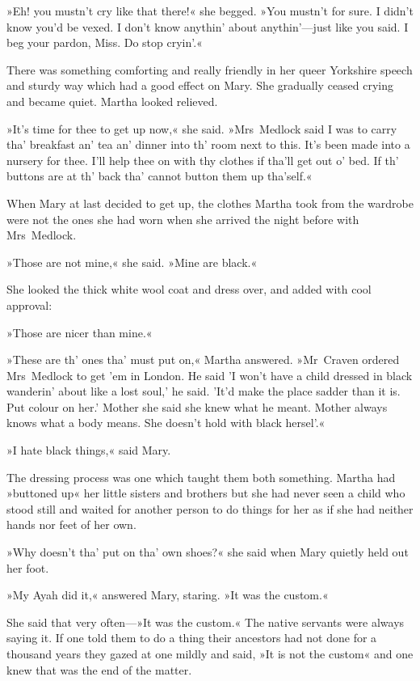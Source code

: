 »Eh! you mustn't cry like that there!« she begged. »You mustn't for sure. I didn't know you'd be vexed. I don't know anythin' about anythin'—just like you said. I beg your pardon, Miss. Do stop cryin'.«

There was something comforting and really friendly in her queer Yorkshire speech and sturdy way which had a good effect on Mary. She gradually ceased crying and became quiet. Martha looked relieved.

»It's time for thee to get up now,« she said. »Mrs~Medlock said I was to carry tha' breakfast an' tea an' dinner into th' room next to this. It's been made into a nursery for thee. I'll help thee on with thy clothes if tha'll get out o' bed. If th' buttons are at th' back tha' cannot button them up tha'self.«

When Mary at last decided to get up, the clothes Martha took from the wardrobe were not the ones she had worn when she arrived the night before with Mrs~Medlock.

»Those are not mine,« she said. »Mine are black.«

She looked the thick white wool coat and dress over, and added with cool approval:

»Those are nicer than mine.«

»These are th' ones tha' must put on,« Martha answered. »Mr~Craven ordered Mrs~Medlock to get 'em in London. He said 'I won't have a child dressed in black wanderin' about like a lost soul,' he said. 'It'd make the place sadder than it is. Put colour on her.' Mother she said she knew what he meant. Mother always knows what a body means. She doesn't hold with black hersel'.«

»I hate black things,« said Mary.

The dressing process was one which taught them both something. Martha had »buttoned up« her little sisters and brothers but she had never seen a child who stood still and waited for another person to do things for her as if she had neither hands nor feet of her own.

»Why doesn't tha' put on tha' own shoes?« she said when Mary quietly held out her foot.

»My Ayah did it,« answered Mary, staring. »It was the custom.«

She said that very often—»It was the custom.« The native servants were always saying it. If one told them to do a thing their ancestors had not done for a thousand years they gazed at one mildly and said, »It is not the custom« and one knew that was the end of the matter.

